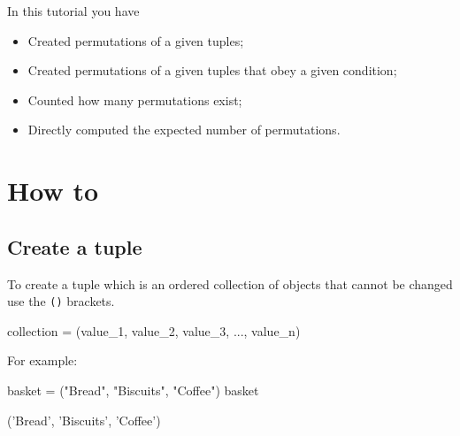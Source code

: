 \begin{note}
In this tutorial you have
\begin{itemize}
\item 

Created permutations of a given tuples;

\item 

Created permutations of a given tuples that obey a given condition;

\item 

Counted how many permutations exist;

\item 

Directly computed the expected number of permutations.

\end{itemize}
\end{note}





\section{How to}
\label{\detokenize{tools-for-mathematics/05-combinations-permutations/how/main:how}}\label{\detokenize{tools-for-mathematics/05-combinations-permutations/how/main::doc}}

\subsection{Create a tuple}
\label{sec:create_a_tuple}

To create a tuple which is an ordered collection of objects that cannot be
changed use the \texttt{()} brackets.


\begin{api}
collection = (value_1, value_2, value_3, ..., value_n)
\end{api}



For example:




\begin{pyin}
basket = ("Bread", "Biscuits", "Coffee")
basket
\end{pyin}





\begin{raw}
('Bread', 'Biscuits', 'Coffee')
\end{raw}

